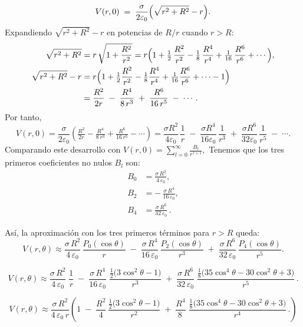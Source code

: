 \documentclass[12pt]{article}
\begin{document}
\[
V(r,0) \;=\; \frac{\sigma}{2\varepsilon_{0}} \Bigl(\sqrt{r^{2}+R^{2}} - r\Bigr).
\]
Expandiendo \(\sqrt{r^{2}+R^{2}} - r\) en potencias de \(R/r\) cuando \(r>R\):
\begin{align*}
\sqrt{r^{2}+R^{2}} 
&= r\,\sqrt{1 + \frac{R^{2}}{r^{2}}}
= r \Bigl( 1 + \tfrac{1}{2}\,\frac{R^{2}}{r^{2}} - \tfrac{1}{8}\,\frac{R^{4}}{r^{4}} 
      + \tfrac{1}{16}\,\frac{R^{6}}{r^{6}} + \cdots \Bigr), \\
%
\sqrt{r^{2}+R^{2}} - r 
&= r\Bigl(1 + \tfrac{1}{2}\frac{R^{2}}{r^{2}} - \tfrac{1}{8}\frac{R^{4}}{r^{4}} 
          + \tfrac{1}{16}\frac{R^{6}}{r^{6}} + \cdots - 1\Bigr) \\
&= \frac{R^{2}}{2r} 
   \;-\; \frac{R^{4}}{8\,r^{3}} 
   \;+\; \frac{R^{6}}{16\,r^{5}} 
   \;-\; \cdots.
\end{align*}
Por tanto,
\[
V(r,0) 
= \frac{\sigma}{2\varepsilon_{0}} 
  \left(\tfrac{R^{2}}{2r} - \tfrac{R^{4}}{8\,r^{3}} + \tfrac{R^{6}}{16\,r^{5}} - \cdots \right)
= \frac{\sigma R^{2}}{4\varepsilon_{0}}\,\frac{1}{r} 
  \;-\; \frac{\sigma R^{4}}{16\varepsilon_{0}}\,\frac{1}{r^{3}} 
  \;+\; \frac{\sigma R^{6}}{32\varepsilon_{0}}\,\frac{1}{r^{5}} 
  \;-\; \cdots.
\]
Comparando este desarrollo con
\(\displaystyle
V(r,0)=\sum_{l=0}^{\infty} \frac{B_{l}}{r^{\,l+1}},
\)
Tenemos que los tres primeros coeficientes no nulos \(B_{l}\) son:
\[
\begin{aligned}
B_{0} &= \frac{\sigma\,R^{2}}{4\,\varepsilon_{0}}, \\[6pt]
B_{2} &= -\,\frac{\sigma\,R^{4}}{16\,\varepsilon_{0}}, \\[6pt]
B_{4} &= \frac{\sigma\,R^{6}}{32\,\varepsilon_{0}}\,.
\end{aligned}
\]

Así, la aproximación con los tres primeros términos para \(r>R\) queda:
\[
V(r,\theta)
\approx
\frac{\sigma\,R^{2}}{4\,\varepsilon_{0}}\,\frac{P_{0}(\cos\theta)}{r}
\;-\;
\frac{\sigma\,R^{4}}{16\,\varepsilon_{0}}\,\frac{P_{2}(\cos\theta)}{r^{3}}
\;+\;
\frac{\sigma\,R^{6}}{32\,\varepsilon_{0}}\,\frac{P_{4}(\cos\theta)}{r^{5}}.
\]

\[
V(r,\theta)\approx
\frac{\sigma\,R^{2}}{4\,\varepsilon_{0}}\;\frac{1}{r}
\;-\;
\frac{\sigma\,R^{4}}{16\,\varepsilon_{0}}\;\frac{\displaystyle \frac{1}{2}\bigl(3\cos^{2}\theta - 1\bigr)}{r^{3}}
\;+\;
\frac{\sigma\,R^{6}}{32\,\varepsilon_{0}}\;\frac{\displaystyle \frac{1}{8}\bigl(35\cos^{4}\theta - 30\cos^{2}\theta + 3\bigr)}{r^{5}}\,.
\]

\[
V(r,\theta)\approx
\frac{\sigma\,R^{2}}{4\,\varepsilon_{0}\,r} \left( 
1 \;-\;
\frac{R^{2}}{4}\,\frac{\displaystyle \frac{1}{2}\bigl(3\cos^{2}\theta - 1\bigr)}{r^{2}}
\;+\;
\frac{R^{4}}{8\,}\;\frac{\displaystyle \frac{1}{8}\bigl(35\cos^{4}\theta - 30\cos^{2}\theta + 3\bigr)}{r^{4}}\,.
\right)\]
\bigskip
\end{document}
